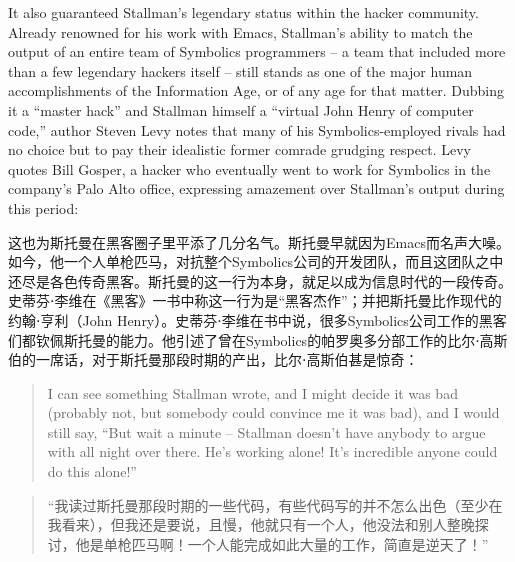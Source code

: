 \ifdefined\eng
It also guaranteed Stallman's legendary status within the hacker community. Already renowned for his work with Emacs, Stallman's ability to match the output of an entire team of Symbolics programmers -- a team that included more than a few legendary hackers itself -- still stands as one of the major human accomplishments of the Information Age, or of any age for that matter. Dubbing it a ``master hack'' and Stallman himself a ``virtual John Henry of computer code,'' author Steven Levy notes that many of his Symbolics-employed rivals had no choice but to pay their idealistic former comrade grudging respect. Levy quotes Bill Gosper, a hacker who eventually went to work for Symbolics in the company's Palo Alto office, expressing amazement over Stallman's output during this period:
\fi

\ifdefined\chs
这也为斯托曼在黑客圈子里平添了几分名气。斯托曼早就因为Emacs而名声大噪。如今，他一个人单枪匹马，对抗整个Symbolics公司的开发团队，而且这团队之中还尽是各色传奇黑客。斯托曼的这一行为本身，就足以成为信息时代的一段传奇。史蒂芬⋅李维在《黑客》一书中称这一行为是``黑客杰作''；并把斯托曼比作现代的约翰⋅亨利（John Henry）。史蒂芬⋅李维在书中说，很多Symbolics公司工作的黑客们都钦佩斯托曼的能力。他引述了曾在Symbolics的帕罗奥多分部工作的比尔⋅高斯伯的一席话，对于斯托曼那段时期的产出，比尔⋅高斯伯甚是惊奇：
\fi

\ifdefined\eng
\begin{quote}
I can see something Stallman wrote, and I might decide it was bad (probably not, but somebody could convince me it was bad), and I would still say, ``But wait a minute -- Stallman doesn't have anybody to argue with all night over there. He's working alone! It's incredible anyone could do this alone!''
\end{quote}
\fi

\ifdefined\chs
\begin{quote}
``我读过斯托曼那段时期的一些代码，有些代码写的并不怎么出色（至少在我看来），但我还是要说，且慢，他就只有一个人，他没法和别人整晚探讨，他是单枪匹马啊！一个人能完成如此大量的工作，简直是逆天了！''
\end{quote}
\fi


